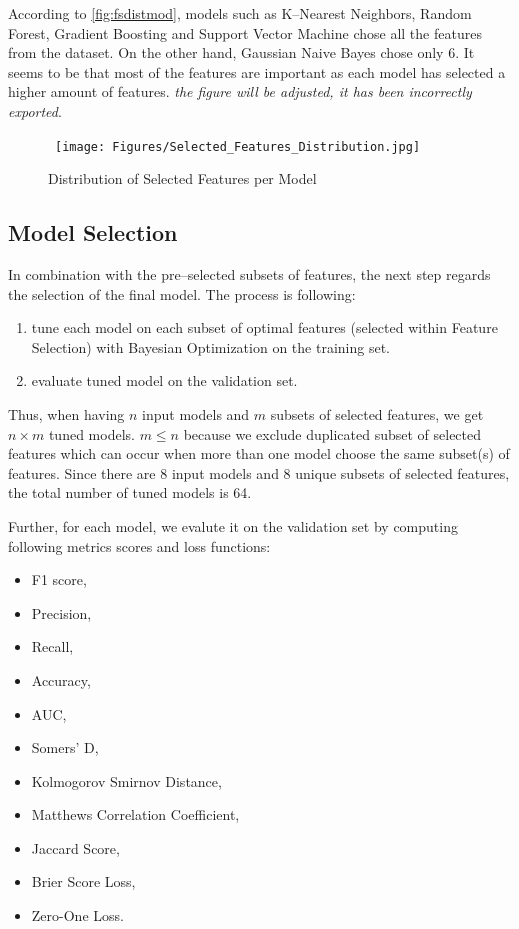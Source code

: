 According to \autoref{fig:fsdistmod}, models such as K--Nearest Neighbors, Random Forest, Gradient Boosting and Support Vector Machine chose all the features from the dataset. On the other hand, Gaussian Naive Bayes chose only 6. It seems to be that most of the features are important as each model has selected a higher amount of features. \textit{the figure will be adjusted, it has been incorrectly exported}.

\begin{figure}[H]
    \centering
    \caption{Distribution of Selected Features per Model}\vspace{0.5em}
    \label{fig:fsdistmod}\
    \texttt{[image: Figures/Selected\_Features\_Distribution.jpg]}
    \vspace{-1em}
\end{figure}

\subsection{Model Selection}

In combination with the pre--selected subsets of features, the next step regards the selection of the final model. The process is following:

\begin{enumerate}\setlength\itemsep{0em}
    \item tune each model on each subset of optimal features (selected within Feature Selection) with Bayesian Optimization on the training set.
    \item evaluate tuned model on the validation set.
\end{enumerate}

Thus, when having $n$ input models and $m$ subsets of selected features, we get $n \times m$ tuned models.
$m \leq n$ because we exclude duplicated subset of selected features which can occur when more than one model choose the same subset(s) of features.
Since there are 8 input models and 8 unique subsets of selected features, the total number of tuned models is 64.

Further, for each model, we evalute it on the validation set by computing following metrics scores and loss functions:
\begin{itemize}\setlength\itemsep{0em}
    \item F1 score,
    \item Precision,
    \item Recall,
    \item Accuracy,
    \item AUC,
    \item Somers' D,
    \item Kolmogorov Smirnov Distance,
    \item Matthews Correlation Coefficient,
    \item Jaccard Score,
    \item Brier Score Loss,
    \item Zero-One Loss.
\end{itemize}

